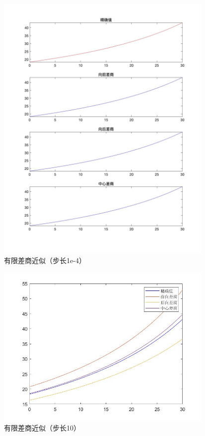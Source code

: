 \documentclass[a4paper,12pt]{ctexart}
\begin{document}
\begin{figure}[H]
    \centering
    \includegraphics[width=10.5cm]{第五章作业/youxianchashang.jpg}
    \caption{有限差商近似（步长1e-4）}
\end{figure}
\begin{figure}[H]
    \centering
    \includegraphics[width=10.5cm]{第五章作业/chashang10.jpg}
    \caption{有限差商近似（步长10）}
\end{figure}
\end{document}
